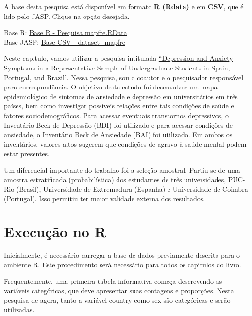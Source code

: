 \documentclass[
]{book}
\newenvironment{base}{
  \definecolor{shadecolor}{rgb}{0, 0, 0}  %
  \color{white}
  \begin{shaded}}
 {\end{shaded}}
\begin{document}
\begin{base}

A base desta pesquisa está disponível em formato \textbf{R (Rdata)} e em \textbf{CSV}, que é lido pelo JASP. Clique na opção desejada.

Base R: \href{https://github.com/anovabr/mqt/raw/master/bases/Base\%20R\%20-\%20Pesquisa\%20mapfre.RData}{Base R - Pesquisa mapfre.RData}\\
Base JASP: \href{https://github.com/anovabr/mqt/raw/master/bases/bases_csv_jasp.zip}{Base CSV - dataset\_mapfre}

\end{base}

Neste capítulo, vamos utilizar a pesquisa intitulada \href{https://doi.org/10.1590/0102.3772e36412}{``Depression and Anxiety Symptoms in a Representative Sample of Undergraduate Students in Spain, Portugal, and Brazil''}. Nessa pesquisa, sou o coautor e o pesquisador responsável para correspondência. O objetivo deste estudo foi desenvolver um mapa epidemiológico de sintomas de ansiedade e depressão em universitários em três países, bem como investigar possíveis relações entre tais condições de saúde e fatores sociodemográficos. Para acessar eventuais transtornos depressivos, o Inventário Beck de Depressão (BDI) foi utilizado e para acessar condições de ansiedade, o Inventário Beck de Ansiedade (BAI) foi utilizado. Em ambos os inventários, valores altos sugerem que condições de agravo à saúde mental podem estar presentes.

Um diferencial importante do trabalho foi a seleção amostral. Partiu-se de uma amostra estratificada (probabilística) dos estudantes de três universidades, PUC-Rio (Brasil), Universidade de Extremadura (Espanha) e Universidade de Coimbra (Portugal). Isso permitiu ter maior validade externa dos resultados.

\hypertarget{execuuxe7uxe3o-no-r}{%
\section{Execução no R}\label{execuuxe7uxe3o-no-r}}

Inicialmente, é necessário carregar a base de dados previamente descrita para o ambiente R. Este procedimento será necessário para todos os capítulos do livro.

Frequentemente, uma primeira tabela informativa começa descrevendo as variáveis categóricas, que deve apresentar suas contagens e proporções. Nesta pesquisa de agora, tanto a variável country como sex são categóricas e serão utilizadas.
\end{document}
